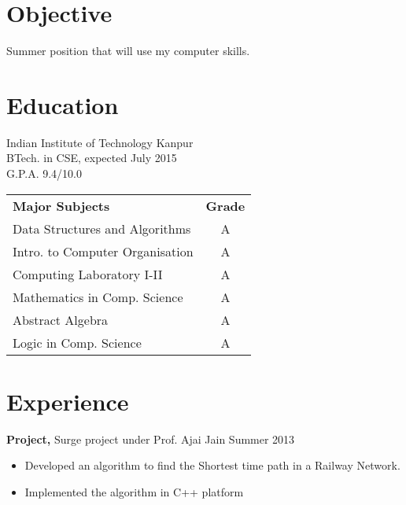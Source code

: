 \documentclass[margin]{res}
\begin{document}
 
\begin{resume} 
 
\section{Objective} 
Summer position that will use my computer skills.

\section{Education} 
Indian Institute of Technology Kanpur\\
                BTech. in CSE, expected July 2015 \\
                G.P.A. 9.4/10.0 
 
                \begin{tabular}{ l c }
               
                {\bf Major Subjects}   &  {\bf Grade} \\
                Data Structures and Algorithms           &  A \\
                Intro. to Computer Organisation &  A \\
                Computing Laboratory I-II        & A \\
                Mathematics in Comp. Science  & A \\
                Abstract Algebra   &  A \\
                Logic in Comp. Science &  A\\
		\end{tabular}

\section{Experience}
{\bf Project,} Surge project under Prof. Ajai Jain \hfill
Summer 2013                
                \begin{itemize} \itemsep -2pt
                 \item Developed an algorithm to find the Shortest time path in a Railway Network.
                
                 \item Implemented the algorithm in C++ platform

		 \end{itemize}


\end{resume}
\end{document}
